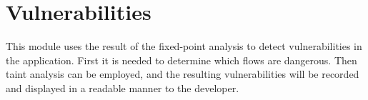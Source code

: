\section{Vulnerabilities}\label{impl:vulnerabilities}
This module uses the result of the fixed-point analysis to detect vulnerabilities in the application.
First it is needed to determine which flows are dangerous.
Then taint analysis can be employed, and the resulting vulnerabilities will be recorded and displayed in a readable manner to the developer.
